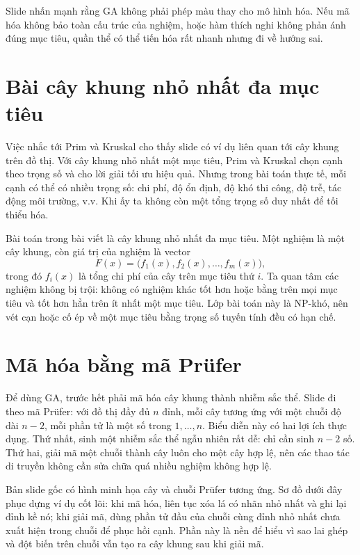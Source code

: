 \documentclass[11pt]{article}
\newcommand{\GA}{\ensuremath{\mathrm{GA}}}
\newcommand{\Pruefer}{Prüfer}
\begin{document}
Slide nhấn mạnh rằng \GA{} không phải phép màu thay cho mô hình hóa. Nếu mã
hóa không bảo toàn cấu trúc của nghiệm, hoặc hàm thích nghi không phản ánh
đúng mục tiêu, quần thể có thể tiến hóa rất nhanh nhưng đi về hướng sai.

\section{Bài cây khung nhỏ nhất đa mục tiêu}

Việc nhắc tới Prim và Kruskal cho thấy slide có ví dụ liên quan tới cây khung
trên đồ thị. Với cây khung nhỏ nhất một mục tiêu, Prim và Kruskal chọn cạnh
theo trọng số và cho lời giải tối ưu hiệu quả. Nhưng trong bài toán thực tế,
mỗi cạnh có thể có nhiều trọng số: chi phí, độ ổn định, độ khó thi công, độ
trễ, tác động môi trường, v.v. Khi ấy ta không còn một tổng trọng số duy nhất
để tối thiểu hóa.

Bài toán trong bài viết là cây khung nhỏ nhất đa mục tiêu. Một nghiệm là một
cây khung, còn giá trị của nghiệm là vector
\[
  F(x)=\bigl(f_1(x),f_2(x),\ldots,f_m(x)\bigr),
\]
trong đó \(f_i(x)\) là tổng chi phí của cây trên mục tiêu thứ \(i\). Ta quan
tâm các nghiệm không bị trội: không có nghiệm khác tốt hơn hoặc bằng trên mọi
mục tiêu và tốt hơn hẳn trên ít nhất một mục tiêu. Lớp bài toán này là
NP-khó, nên vét cạn hoặc cố ép về một mục tiêu bằng trọng số tuyến tính đều
có hạn chế.

\section{Mã hóa bằng mã \Pruefer}

Để dùng \GA{}, trước hết phải mã hóa cây khung thành nhiễm sắc thể. Slide đi
theo mã \Pruefer{}: với đồ thị đầy đủ \(n\) đỉnh, mỗi cây tương ứng với một
chuỗi độ dài \(n-2\), mỗi phần tử là một số trong \(1,\ldots,n\). Biểu diễn
này có hai lợi ích thực dụng. Thứ nhất, sinh một nhiễm sắc thể ngẫu nhiên rất
dễ: chỉ cần sinh \(n-2\) số. Thứ hai, giải mã một chuỗi thành cây luôn cho
một cây hợp lệ, nên các thao tác di truyền không cần sửa chữa quá nhiều nghiệm
không hợp lệ.

Bản slide gốc có hình minh họa cây và chuỗi \Pruefer{} tương ứng. Sơ đồ dưới
đây phục dựng ví dụ cốt lõi: khi mã hóa, liên tục xóa lá có nhãn nhỏ nhất và
ghi lại đỉnh kề nó; khi giải mã, dùng phần tử đầu của chuỗi cùng đỉnh nhỏ nhất
chưa xuất hiện trong chuỗi để phục hồi cạnh. Phần này là nền để hiểu vì sao
lai ghép và đột biến trên chuỗi vẫn tạo ra cây khung sau khi giải mã.
\end{document}
